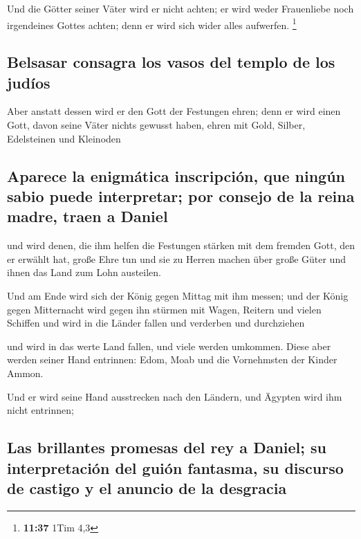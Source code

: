  Und die Götter seiner Väter wird er nicht achten; er
wird weder Frauenliebe noch irgendeines Gottes achten; denn er wird sich
wider alles aufwerfen. \footnote{\textbf{11:37} 1Tim 4,3}

\hypertarget{belsasar-consagra-los-vasos-del-templo-de-los-juduxedos}{%
\subsection{Belsasar consagra los vasos del templo de los
judíos}\label{belsasar-consagra-los-vasos-del-templo-de-los-juduxedos}}

 Aber anstatt dessen wird er den Gott der Festungen
ehren; denn er wird einen Gott, davon seine Väter nichts gewusst haben,
ehren mit Gold, Silber, Edelsteinen und Kleinoden

\hypertarget{aparece-la-enigmuxe1tica-inscripciuxf3n-que-ninguxfan-sabio-puede-interpretar-por-consejo-de-la-reina-madre-traen-a-daniel}{%
\subsection{Aparece la enigmática inscripción, que ningún sabio puede
interpretar; por consejo de la reina madre, traen a
Daniel}\label{aparece-la-enigmuxe1tica-inscripciuxf3n-que-ninguxfan-sabio-puede-interpretar-por-consejo-de-la-reina-madre-traen-a-daniel}}

 und wird denen, die ihm helfen die Festungen stärken mit
dem fremden Gott, den er erwählt hat, große Ehre tun und sie zu Herren
machen über große Güter und ihnen das Land zum Lohn austeilen.

 Und am Ende wird sich der König gegen Mittag mit ihm
messen; und der König gegen Mitternacht wird gegen ihn stürmen mit
Wagen, Reitern und vielen Schiffen und wird in die Länder fallen und
verderben und durchziehen

 und wird in das werte Land fallen, und viele werden
umkommen. Diese aber werden seiner Hand entrinnen: Edom, Moab und die
Vornehmsten der Kinder Ammon.

 Und er wird seine Hand ausstrecken nach den Ländern, und
Ägypten wird ihm nicht entrinnen;

\hypertarget{las-brillantes-promesas-del-rey-a-daniel-su-interpretaciuxf3n-del-guiuxf3n-fantasma-su-discurso-de-castigo-y-el-anuncio-de-la-desgracia}{%
\subsection{Las brillantes promesas del rey a Daniel; su interpretación
del guión fantasma, su discurso de castigo y el anuncio de la
desgracia}\label{las-brillantes-promesas-del-rey-a-daniel-su-interpretaciuxf3n-del-guiuxf3n-fantasma-su-discurso-de-castigo-y-el-anuncio-de-la-desgracia}}

